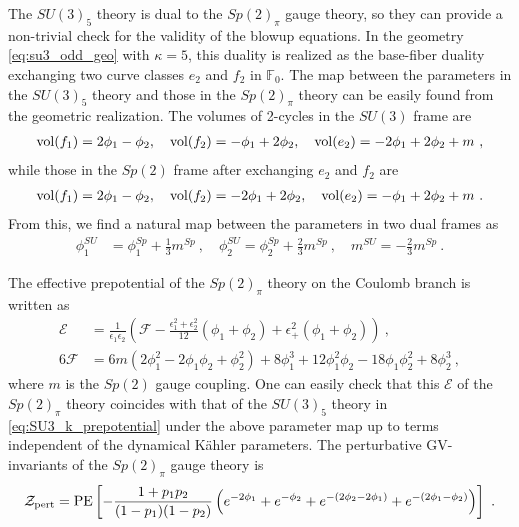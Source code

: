 The $ SU(3)_5 $ theory is dual to the $ Sp(2)_\pi $ gauge theory, so they can provide a non-trivial check for the validity of the blowup equations. In the geometry \eqref{eq:su3_odd_geo} with $\kappa=5$, this duality is realized as the base-fiber duality exchanging two curve classes $e_2$ and $f_2$ in $\mathbb{F}_0$. The map between the parameters in the $ SU(3)_5 $ theory and those in the $ Sp(2)_\pi $ theory can be easily found from the geometric realization. The volumes of 2-cycles in the $ SU(3) $ frame are
\begin{align}\label{eq:su3_5_vol}
\operatorname{vol}(f_1)= 2 \phi_1 - \phi_2, \quad
\operatorname{vol}(f_2) = -\phi_1 + 2\phi_2, \quad
\operatorname{vol}(e_2) = -2\phi_1 + 2\phi_2 + m\ ,
\end{align}
while those in the $ Sp(2) $ frame after exchanging $e_2$ and $f_2$ are
\begin{align}
\operatorname{vol}(f_1) = 2\phi_1 - \phi_2, \quad
\operatorname{vol}(f_2) = -2\phi_1 + 2\phi_2, \quad
\operatorname{vol}(e_2) = -\phi_1 + 2\phi_2 + m\ .
\end{align}
From this, we find a natural map between the parameters in two dual frames as \cite{Gaiotto:2015una, Hayashi:2016abm, Hayashi:2018lyv}
\begin{align}
\phi_1^{SU} &= \phi_1^{Sp} + \frac{1}{3} m^{Sp} \ , \quad \phi_2^{SU} = \phi_2^{Sp} + \frac{2}{3} m^{Sp} \ ,\quad
m^{SU} = -\frac{2}{3} m^{Sp}\ . \label{eq:SU3 and Sp2 duality map}
\end{align}

The effective prepotential of the $Sp(2)_\pi$ theory on the Coulomb branch is written as
\begin{align}
\mathcal{E} &= \frac{1}{\epsilon_1\epsilon_2}\left(\mathcal{F} -\frac{\epsilon_1^2+\epsilon_2^2}{12}(\phi_1+\phi_2) + \epsilon_+^2(\phi_1+\phi_2)\right) \ , \nonumber \\
6\mathcal{F}
 &= 6m (2\phi_1^2 - 2\phi_1 \phi_2 + \phi_2^2)+8\phi_1^3 + 12\phi_1^2 \phi_2 - 18\phi_1 \phi_2^2 + 8\phi_2^3 \ ,
\end{align}
where $ m $ is the $ Sp(2) $ gauge coupling. One can easily check that this $\mathcal{E}$ of the $ Sp(2)_\pi $ theory coincides with that of the $ SU(3)_5 $ theory in \eqref{eq:SU3_k_prepotential} under the above parameter map up to terms independent of the dynamical K\"ahler parameters. The perturbative GV-invariants of the $Sp(2)_\pi$ gauge theory is
\begin{align}
	\mathcal{Z}_{\rm pert} = {\rm PE} \left[ -\frac{1+p_1p_2}{(1-p_1)(1-p_2)}\left(e^{-2\phi_1}+e^{-\phi_2}+e^{-(2\phi_2-2\phi_1)}+e^{-(2\phi_1-\phi_2)}\right)\right] \ .
\end{align} 

